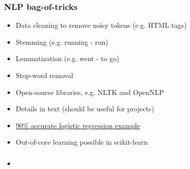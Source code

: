 \documentclass{beamer}
\begin{document}
\begin{frame}
  \frametitle{NLP bag-of-tricks}
  \begin{itemize}
  \item Data cleaning to remove noisy tokens (e.g. HTML tags)
  \item Stemming (e.g. running - run)
  \item Lemmatization (e.g. went - to go)
  \item Stop-word removal
  \item Open-source libraries, e.g. NLTK and OpenNLP
  \item Details in text (should be useful for projects)
  \item \href{https://github.com/rasbt/python-machine-learning-book/blob/master/code/ch08/ch08.ipynb}{90\% accurate logistic regression example}
  \item Out-of-core learning possible in scikit-learn
  \end{itemize}
\end{frame}

\begin{frame}
  \frametitle{}
  \begin{itemize}
  \item 
  \end{itemize}
\end{frame}
\end{document}

